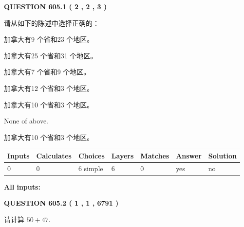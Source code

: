 \documentclass{ctexart}
\begin{document}
\vspace{0.2in}
  
{\textbf{\Large{QUESTION
605.1 
 ( 2 , 2 , 3 )
}}}
  
  
请从如下的陈述中选择正确的：
 
 
加拿大有9 个省和23 个地区。
 
 
加拿大有25 个省和31 个地区。
 
 
加拿大有7 个省和9 个地区。
 
 
加拿大有12 个省和3 个地区。
 
 
加拿大有10 个省和3 个地区。
 
 
 None of above.
 
 
\noindent{}
 
 
加拿大有10 个省和3 个地区。
 
 
\noindent{}
 
 
   
   
   
   
\noindent\begin{tabular}{|l|l|l|l|l|l|l|}
 \hline
Inputs & Calculates & Choices & Layers & Matches & Answer & Solution \\ \hline
 0  & 
 0  & 
 6
  simple  
  & 
 6  & 
 0  & 
  yes & 
  no 
  \\ \hline
 \end{tabular}
   
   
   
   
\noindent{}
   
   
   
   
\noindent\vspace{0.1in}\hspace{-0.08in} {\textbf{\Large{All inputs: }}}
   
   
  
\vspace{0.2in}
  
{\textbf{\Large{QUESTION
605.2 
 ( 1 , 1 , 6791 )
}}}
  
  
 
请计算 $ %
50 +  %
47 $.
 
\end{document}
